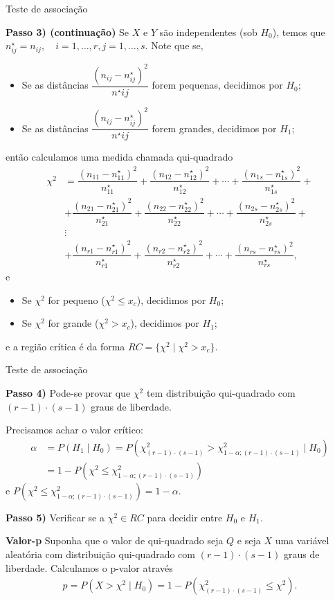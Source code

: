 \documentclass[9pt]{beamer}
\begin{document}
\begin{frame}{Teste de associação}

\scriptsize
{\bf Passo 3) (continuação)} Se $X$ e $Y$ são independentes (sob $H_0$), temos que $n^\star_{ij}=n_{ij}, \quad i=1,\dots, r,j=1,\dots, s$. Note que se,
\begin{itemize}
	\item Se as distâncias $\dfrac{(n_{ij}-n^\star_{ij})^2}{n^\star{ij}}$ forem pequenas, decidimos por $H_0$;
	\item Se as distâncias $\dfrac{(n_{ij}-n^\star_{ij})^2}{n^\star{ij}}$ forem grandes, decidimos por $H_1$;
\end{itemize}
então calculamos uma medida chamada qui-quadrado 
\begin{align*}
\chi^2 &= \dfrac{(n_{11} - n^\star_{11})^2}{n^\star_{11}} + \dfrac{(n_{12} - n^\star_{12})^2}{n^\star_{12}} + \cdots + \dfrac{(n_{1s} - n^\star_{1s})^2}{n^\star_{1s}} + \\
&+ \dfrac{(n_{21} - n^\star_{21})^2}{n^\star_{21}} + \dfrac{(n_{22} - n^\star_{22})^2}{n^\star_{22}} + \cdots + \dfrac{(n_{2s} - n^\star_{2s})^2}{n^\star_{2s}} + \\
&\vdots\\
&+\dfrac{(n_{r1} - n^\star_{r1})^2}{n^\star_{r1}} + \dfrac{(n_{r2} - n^\star_{r2})^2}{n^\star_{r2}} + \cdots + \dfrac{(n_{rs} - n^\star_{rs})^2}{n^\star_{rs}},
\end{align*}
e
\begin{itemize}
	\item Se $\chi^2$ for pequeno ($\chi^2 \leq x_c$), decidimos por $H_0$;
	\item Se $\chi^2$ for grande ($\chi^2 > x_c$), decidimos por $H_1$;
\end{itemize}
e a região crítica é da forma $RC= \{\chi^2 \mid \chi^2 > x_c \}$.
	
\normalsize
\end{frame}

\begin{frame}{Teste de associação}


{\bf Passo 4)} Pode-se provar que $\chi^2$ tem distribuição qui-quadrado com $(r-1)\cdot (s-1)$ graus de liberdade. 

Precisamos achar o valor crítico:
\begin{align*}
\alpha &= P(H_1 \mid H_0)= P(\chi_{(r-1)\cdot (s-1)}^2 > \chi^2_{1-\alpha;(r-1)\cdot (s-1)} \mid H_0)\\
&= 1 - P(\chi^2 \leq \chi^2_{1-\alpha;(r-1)\cdot (s-1)})
\end{align*}
e $P(\chi^2 \leq \chi^2_{1-\alpha;(r-1)\cdot (s-1)}) = 1 - \alpha$.
\vfill

{\bf Passo 5)} Verificar se a $\chi^2 \in RC$ para decidir entre $H_0$ e $H_1$.
\vfill

{\bf Valor-p} Suponha que o valor de qui-quadrado seja $Q$ e seja $X$ uma variável aleatória com distribuição qui-quadrado com $(r-1)\cdot (s-1)$ graus de liberdade. Calculamos o p-valor através 
\begin{align*}
p = P(X > \chi^2 \mid H_0) = 1 - P(\chi_{(r-1)\cdot (s-1)}^2 \leq \chi^2).
\end{align*}

\end{frame}
\end{document}
